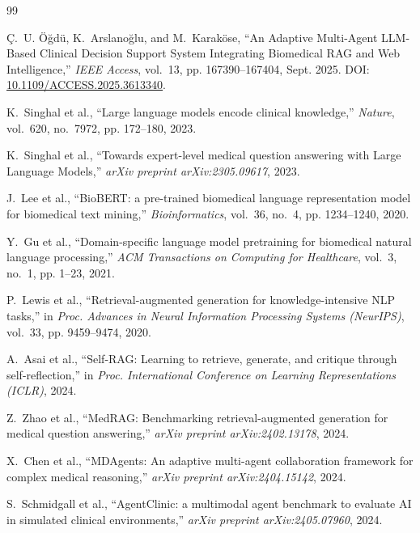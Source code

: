 \documentclass[12pt,a4paper]{report}
\begin{document}
\newpage
\begin{thebibliography}{99}

Ç.~U. Öğdü, K.~Arslanoğlu, and M.~Karaköse, ``An Adaptive Multi-Agent LLM-Based Clinical Decision Support System Integrating Biomedical RAG and Web Intelligence,'' \emph{IEEE Access}, vol.~13, pp. 167390--167404, Sept. 2025. DOI: \url{10.1109/ACCESS.2025.3613340}.

K.~Singhal et al., ``Large language models encode clinical knowledge,'' \emph{Nature}, vol.~620, no.~7972, pp. 172--180, 2023.

K.~Singhal et al., ``Towards expert-level medical question answering with Large Language Models,'' \emph{arXiv preprint arXiv:2305.09617}, 2023.

J.~Lee et al., ``BioBERT: a pre-trained biomedical language representation model for biomedical text mining,'' \emph{Bioinformatics}, vol.~36, no.~4, pp. 1234--1240, 2020.

Y.~Gu et al., ``Domain-specific language model pretraining for biomedical natural language processing,'' \emph{ACM Transactions on Computing for Healthcare}, vol.~3, no.~1, pp. 1--23, 2021.

P.~Lewis et al., ``Retrieval-augmented generation for knowledge-intensive NLP tasks,'' in \emph{Proc. Advances in Neural Information Processing Systems (NeurIPS)}, vol.~33, pp. 9459--9474, 2020.

A.~Asai et al., ``Self-RAG: Learning to retrieve, generate, and critique through self-reflection,'' in \emph{Proc. International Conference on Learning Representations (ICLR)}, 2024.

Z.~Zhao et al., ``MedRAG: Benchmarking retrieval-augmented generation for medical question answering,'' \emph{arXiv preprint arXiv:2402.13178}, 2024.

X.~Chen et al., ``MDAgents: An adaptive multi-agent collaboration framework for complex medical reasoning,'' \emph{arXiv preprint arXiv:2404.15142}, 2024.

S.~Schmidgall et al., ``AgentClinic: a multimodal agent benchmark to evaluate AI in simulated clinical environments,'' \emph{arXiv preprint arXiv:2405.07960}, 2024.


\end{thebibliography}
\end{document}
